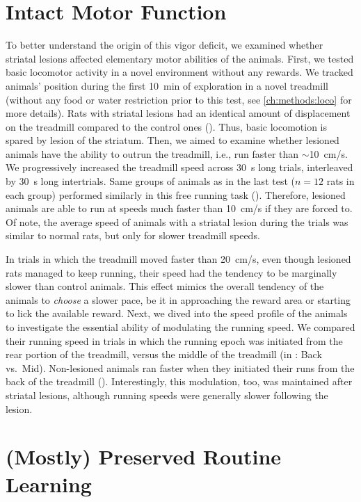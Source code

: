 \section{Intact Motor Function}
\label{ch:lesion:motorOk}

To better understand the origin of this vigor deficit, we examined whether striatal lesions affected elementary motor abilities of the animals.
First, we tested basic locomotor activity in a novel environment without any rewards.
We tracked animals' position during the first 10~min of exploration in a novel treadmill (without any food or water restriction prior to this test, see \autoref{ch:methods:loco} for more details).
Rats with striatal lesions had an identical amount of displacement on the treadmill compared to the control ones ().
Thus, basic locomotion is spared by lesion of the striatum.
Then, we aimed to examine whether lesioned animals have the ability to outrun the treadmill, i.e., run faster than $\sim$10~cm/s.
We progressively increased the treadmill speed across 30~s long trials, interleaved by 30~s long intertrials.
Same groups of animals as in the last test ($n=12$ rats in each group) performed similarly in this free running task ().
Therefore, lesioned animals are able to run at speeds much faster than 10~cm/s if they are forced to.
Of note, the average speed of animals with a striatal lesion during the trials was similar to normal rats, but only for slower treadmill speeds.

In trials in which the treadmill moved faster than 20~cm/s, even though lesioned rats managed to keep running, their speed had the tendency to be marginally slower than control animals.
This effect mimics the overall tendency of the animals to \textit{choose} a slower pace, be it in approaching the reward area or starting to lick the available reward.
Next, we dived into the speed profile of the animals to investigate the essential ability of modulating the running speed.
We compared their running speed in trials in which the running epoch was initiated from the rear portion of the treadmill, versus the middle of the treadmill (in : Back vs.\ Mid).
Non-lesioned animals ran faster when they initiated their runs from the back of the treadmill ().
Interestingly, this modulation, too, was maintained after striatal lesions, although running speeds were generally slower following the lesion.


\section[Preserved Routine Learning]{(Mostly) Preserved Routine Learning}
\label{ch:lesion:learn}

